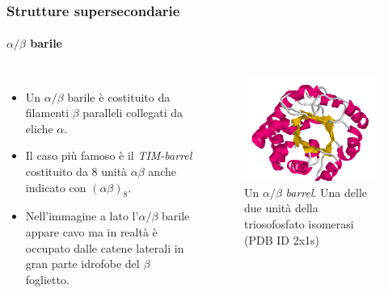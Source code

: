 \documentclass{beamer}
\begin{document}
\begin{frame}
\frametitle{Strutture supersecondarie}
  \framesubtitle{$\alpha/\beta$ barile}\begin{columns}
\begin{itemize}
\item Un $\alpha/\beta$ barile è costituito da filamenti $\beta$ paralleli collegati da eliche $\alpha$.
\pause  \item Il caso più famoso è il \emph{TIM-barrel} costituito da 8 unità $\alpha\beta$ anche indicato con $(\alpha\beta)_8$.
\pause  \item Nell'immagine a lato l'$\alpha/\beta$ barile appare cavo ma in realtà è occupato dalle catene laterali in gran parte idrofobe del $\beta$ foglietto.

\end{itemize} \begin{figure}
\centering
\includegraphics[scale=0.22]{ab-barrel.png}\caption{Un $\alpha/\beta$ \emph{barrel}. Una delle due unità della triosofosfato isomerasi (PDB ID 2x1s)\citep{PDB}}\label{bbarrel}
\end{figure} \end{columns}
\end{frame}
\end{document}
